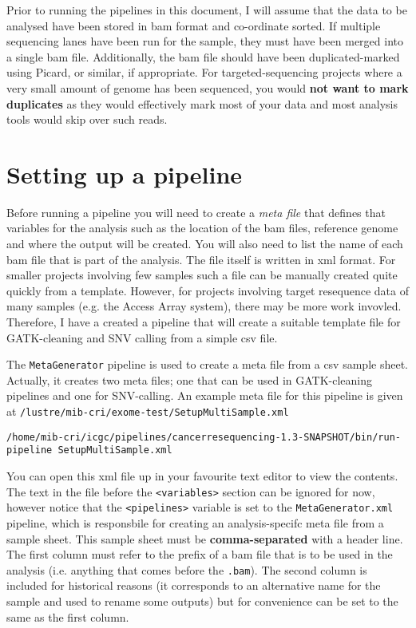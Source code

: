 \documentclass[a4paper,11pt]{article}
\begin{document}
Prior to running the pipelines in this document, I will assume that the data to be analysed have been stored in bam format and co-ordinate sorted. If multiple sequencing lanes have been run for the sample, they must have been merged into a single bam file. Additionally, the bam file should have been duplicated-marked using Picard, or similar, if appropriate. For targeted-sequencing projects where a very small amount of genome has been sequenced, you would \textbf{not want to mark duplicates} as they would effectively mark most of your data and most analysis tools would skip over such reads.

\section{Setting up a pipeline}

Before running a pipeline you will need to create a \textit{meta file} that defines that variables for the analysis such as the location of the bam files, reference genome and where the output will be created. You will also need to list the name of each bam file that is part of the analysis. The file itself is written in xml format. For smaller projects involving few samples such a file can be manually created quite quickly from a template. However, for projects involving target resequence data of many samples (e.g. the Access Array system), there may be more work invovled. Therefore, I have a created a pipeline that will create a suitable template file for GATK-cleaning and SNV calling from a simple csv file. 

The {\tt MetaGenerator} pipeline is used to create a meta file from a csv sample sheet. Actually, it creates two meta files; one that can be used in GATK-cleaning pipelines and one for SNV-calling. An example meta file for this pipeline is given at {\tt /lustre/mib-cri/exome-test/SetupMultiSample.xml}

{\tt /home/mib-cri/icgc/pipelines/cancerresequencing-1.3-SNAPSHOT/bin/run-pipeline SetupMultiSample.xml}

You can open this xml file up in your favourite text editor to view the contents. The text in the file before the {\tt <variables>} section can be ignored for now, however notice that the {\tt <pipelines>} variable is set to the {\tt MetaGenerator.xml} pipeline, which is responsbile for creating an analysis-specifc meta file from a sample sheet. This sample sheet must be \textbf{comma-separated} with a header line. The first column must refer to the prefix of a bam file that is to be used in the analysis (i.e. anything that comes before the {\tt .bam}). The second column is included for historical reasons (it corresponds to an alternative name for the sample and used to rename some outputs) but for convenience can be set to the same as the first column.
\end{document}
